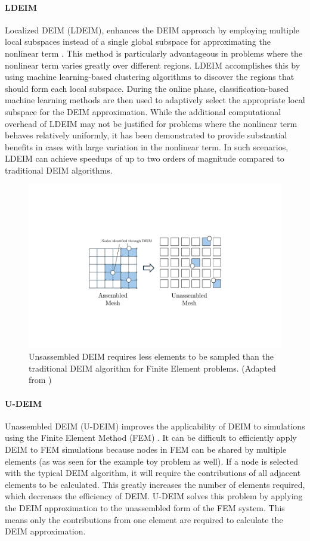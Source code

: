 \documentclass[11pt]{article}
\begin{document}
        \paragraph{LDEIM} Localized DEIM (LDEIM), enhances the DEIM approach by employing multiple local subspaces instead of a single global subspace for approximating the nonlinear term \cite{peherstorfer2014localized}.
        This method is particularly advantageous in problems where the nonlinear term varies greatly over different regions.
        LDEIM accomplishes this by using machine learning-based clustering algorithms to discover the regions that should form each local subspace.
        During the online phase, classification-based machine learning methods are then used to adaptively select the appropriate local subspace for the DEIM approximation.
        While the additional computational overhead of LDEIM may not be justified for problems where the nonlinear term behaves relatively uniformly, it has been demonstrated to provide substantial benefits in cases with large variation in the nonlinear term.
        In such scenarios, LDEIM can achieve speedups of up to two orders of magnitude compared to traditional DEIM algorithms.
        \begin{figure}[t]
                \centering
                \includegraphics[width=0.7\linewidth]{udeim2.pdf}
                \caption{Unsassembled DEIM requires less elements to be sampled than the traditional DEIM algorithm for Finite Element problems. (Adapted from \cite{tiso2013discrete})}
                \label{fig:UDEIM}
        \end{figure}
        \paragraph{U-DEIM} Unassembled DEIM (U-DEIM) improves the applicability of DEIM to simulations using the Finite Element Method (FEM) \cite{tiso2013discrete}.
        It can be difficult to efficiently apply DEIM to FEM simulations because nodes in FEM can be shared by multiple elements (as was seen for the example toy problem as well).
        If a node is selected with the typical DEIM algorithm, it will require the contributions of all adjacent elements to be calculated.
        This greatly increases the number of elements required, which decreases the efficiency of DEIM.
        U-DEIM solves this problem by applying the DEIM approximation to the unassembled form of the FEM system.
        This means only the contributions from one element are required to calculate the DEIM approximation.
\end{document}
